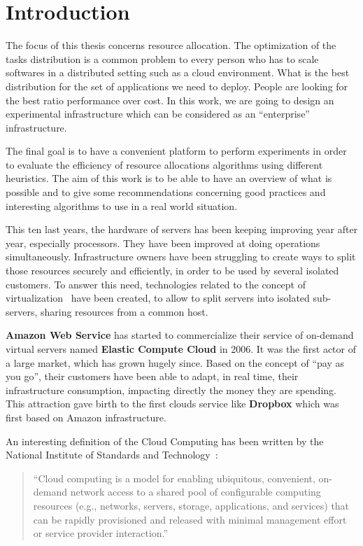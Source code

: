 \chapter*{Introduction}

The focus of this thesis concerns resource allocation. The optimization of the
tasks distribution is a common problem to every person who has to scale
softwares in a distributed setting such as a cloud environment. What is the
best distribution for the set of applications we need to deploy. People are
looking for the best ratio performance over cost. In this work, we are going to
design an experimental infrastructure which can be considered as an
``enterprise'' infrastructure.

The final goal is to have a convenient platform to perform experiments in order
to evaluate the efficiency of resource allocations algorithms using different
heuristics. The aim of this work is to be able to have an overview of what is
possible and to give some recommendations concerning good practices and
interesting algorithms to use in a real world situation.

This ten last years, the hardware of servers has been keeping improving year
after year, especially processors. They have been improved at doing operations
simultaneously. Infrastructure owners have been struggling to create ways to
split those resources securely and efficiently, in order to be used by several
isolated customers. To answer this need, technologies related to the concept of
virtualization~\cite{virtualisation} have been created, to allow to split
servers into isolated sub-servers, sharing resources from a common host.

\textbf{Amazon Web Service} has started to commercialize their service of
on-demand virtual servers named \textbf{Elastic Compute Cloud} in 2006. It was
the first actor of a large market, which has grown hugely since. Based on the
concept of ``pay as you go'', their customers have been able to adapt, in real
time, their infrastructure consumption, impacting directly the money they are
spending. This attraction gave birth to the first clouds service like
\textbf{Dropbox} which was first based on Amazon infrastructure.

An interesting definition of the Cloud Computing has been written by the
National Institute of Standards and Technology~\citep*{nistcloudcomputing}:
\begin{quote}
	“Cloud computing is a model for enabling ubiquitous, convenient, on-demand
	network access to a shared pool of configurable computing resources (e.g.,
	networks, servers, storage, applications, and services) that can be rapidly
	provisioned and released with minimal management effort or service provider
	interaction.”
\end{quote}

